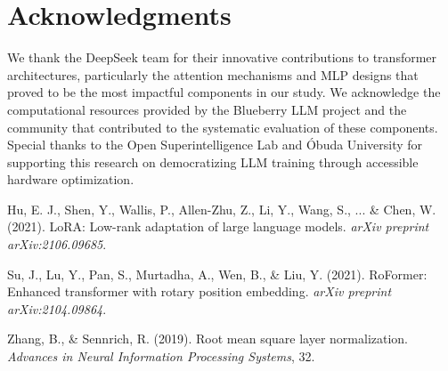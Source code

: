 \documentclass[11pt,a4paper]{article}
\begin{document}
\section*{Acknowledgments}

We thank the DeepSeek team for their innovative contributions to transformer architectures, particularly the attention mechanisms and MLP designs that proved to be the most impactful components in our study. We acknowledge the computational resources provided by the Blueberry LLM project and the community that contributed to the systematic evaluation of these components. Special thanks to the Open Superintelligence Lab and Óbuda University for supporting this research on democratizing LLM training through accessible hardware optimization.

\begin{thebibliography}{9}

Hu, E. J., Shen, Y., Wallis, P., Allen-Zhu, Z., Li, Y., Wang, S., ... \& Chen, W. (2021).
\newblock LoRA: Low-rank adaptation of large language models.
\newblock \textit{arXiv preprint arXiv:2106.09685}.

Su, J., Lu, Y., Pan, S., Murtadha, A., Wen, B., \& Liu, Y. (2021).
\newblock RoFormer: Enhanced transformer with rotary position embedding.
\newblock \textit{arXiv preprint arXiv:2104.09864}.

Zhang, B., \& Sennrich, R. (2019).
\newblock Root mean square layer normalization.
\newblock \textit{Advances in Neural Information Processing Systems}, 32.

\end{thebibliography}
\end{document}
